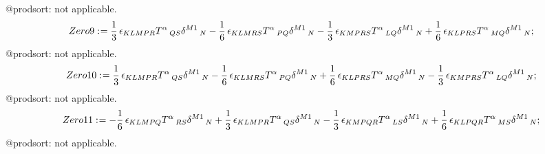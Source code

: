 \documentclass[11pt]{article}
\def\specialcolon{\mathrel{\mathop{:}}\hspace{-.5em}}
\begin{document}
@prodsort: not applicable.
\begin{dmath*}[compact, spread=2pt]
Zero9\specialcolon{}= \frac{1}{3}\, {\epsilon}_{K L M P R} {T}^{\alpha}\,_{Q S} {\delta}^{M1}\,_{N} - \frac{1}{6}\, {\epsilon}_{K L M R S} {T}^{\alpha}\,_{P Q} {\delta}^{M1}\,_{N} - \frac{1}{3}\, {\epsilon}_{K M P R S} {T}^{\alpha}\,_{L Q} {\delta}^{M1}\,_{N} + \frac{1}{6}\, {\epsilon}_{K L P R S} {T}^{\alpha}\,_{M Q} {\delta}^{M1}\,_{N};
\end{dmath*}
@prodsort: not applicable.
\begin{dmath*}[compact, spread=2pt]
Zero10\specialcolon{}= \frac{1}{3}\, {\epsilon}_{K L M P R} {T}^{\alpha}\,_{Q S} {\delta}^{M1}\,_{N} - \frac{1}{6}\, {\epsilon}_{K L M R S} {T}^{\alpha}\,_{P Q} {\delta}^{M1}\,_{N} + \frac{1}{6}\, {\epsilon}_{K L P R S} {T}^{\alpha}\,_{M Q} {\delta}^{M1}\,_{N} - \frac{1}{3}\, {\epsilon}_{K M P R S} {T}^{\alpha}\,_{L Q} {\delta}^{M1}\,_{N};
\end{dmath*}
@prodsort: not applicable.
\begin{dmath*}[compact, spread=2pt]
Zero11\specialcolon{}=  - \frac{1}{6}\, {\epsilon}_{K L M P Q} {T}^{\alpha}\,_{R S} {\delta}^{M1}\,_{N} + \frac{1}{3}\, {\epsilon}_{K L M P R} {T}^{\alpha}\,_{Q S} {\delta}^{M1}\,_{N} - \frac{1}{3}\, {\epsilon}_{K M P Q R} {T}^{\alpha}\,_{L S} {\delta}^{M1}\,_{N} + \frac{1}{6}\, {\epsilon}_{K L P Q R} {T}^{\alpha}\,_{M S} {\delta}^{M1}\,_{N};
\end{dmath*}
@prodsort: not applicable.
\end{document}
